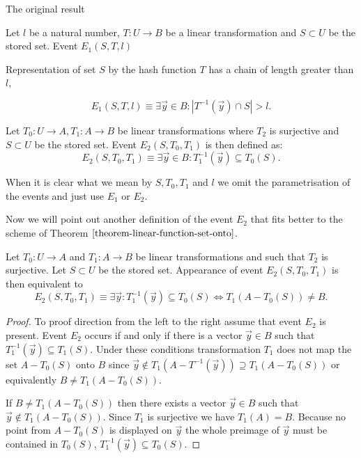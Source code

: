 \begin{section}{The original result}
\begin{definition}
Let $l$ be a natural number, $T: U \rightarrow B$ be a linear transformation and $S \subset U$ be the stored set. Event $E_1(S, T, l)$

\noindent Representation of set $S$ by the hash function $T$ has a chain of length greater than $l$,

\[ 
	E_1(S, T, l) \equiv \exists \vec{y} \in B: | T^{-1}(\vec{y}) \cap S | > l \text{.}
\]
\end{definition}

\begin{definition}
Let $T_0: U \rightarrow A, T_1: A \rightarrow B$ be linear transformations where $T_2$ is surjective and $S \subset U$ be the stored set. Event $E_2(S, T_0, T_1)$ is then defined as:
\[
	E_2(S, T_0, T_1) \equiv \exists \vec{y} \in B: T_1^{-1}(\vec{y}) \subseteq T_0(S) \text{.}
\]
\end{definition}

When it is clear what we mean by $S, T_0, T_1$ and $l$ we omit the parametrisation of the events and just use $E_1$ or $E_2$.

Now we will point out another definition of the event $E_2$ that fits better to the scheme of Theorem $\ref{theorem-linear-function-set-onto}$.
\begin{remark}
\label{remark-e2-equivalency}
Let $T_0: U \rightarrow A$ and $T_1: A \rightarrow B$ be linear transformations and such that $T_2$ is surjective. Let $S \subset U$ be the stored set. Appearance of event $E_2(S, T_0, T_1)$ is then equivalent to
\[
	E_2(S, T_0, T_1) \equiv \exists \vec{y}: T_1^{-1}(\vec{y}) \subseteq T_0(S) \Leftrightarrow T_1(A - T_0(S)) \neq B \text{.}
\]
\end{remark}
\begin{proof}
To proof direction from the left to the right assume that event $E_2$ is present. Event $E_2$ occurs if and only if there is a vector $\vec{y} \in B$ such that $T_1^{-1}(\vec{y}) \subseteq T_1(S)$. Under these conditions transformation $T_1$ does not map the set $A - T_0(S)$ onto $B$ since $\vec{y} \notin T_1(A - T^{-1}(\vec{y})) \supseteq T_1(A - T_0(S))$ or equivalently $B \neq T_1(A - T_0(S))$.

If $B \neq T_1(A - T_0(S))$ then there exists a vector $\vec{y} \in B$ such that $\vec{y} \notin T_1(A - T_0(S))$. Since $T_1$ is surjective we have $T_1(A) = B$. Because no point from $A - T_0(S)$ is displayed on $\vec{y}$ the whole preimage of $\vec{y}$ must be contained in $T_0(S)$, $T_1^{-1}(\vec{y}) \subseteq T_0(S)$.


\end{proof}
\end{section}

